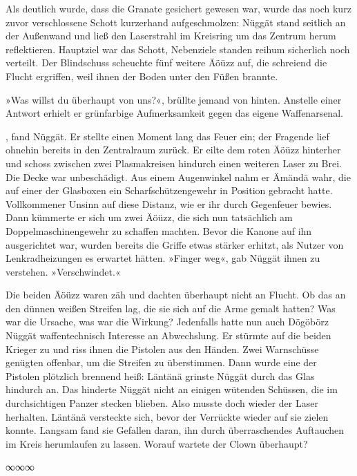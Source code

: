 Als deutlich wurde, dass die Granate gesichert gewesen war, wurde das noch kurz zuvor verschlossene Schott kurzerhand aufgeschmolzen: Nüggät stand seitlich an der Außenwand und ließ den Laserstrahl im Kreisring um das Zentrum herum reflektieren. Hauptziel war das Schott, Nebenziele standen reihum sicherlich noch verteilt. Der Blindschuss scheuchte fünf weitere Äöüzz auf, die schreiend die Flucht ergriffen, weil ihnen der Boden unter den Füßen brannte.

»Was willst du überhaupt von uns?«, brüllte jemand von hinten. Anstelle einer Antwort erhielt er grünfarbige Aufmerksamkeit gegen das eigene Waffenarsenal.

, fand Nüggät. Er stellte einen Moment lang das Feuer ein; der Fragende lief ohnehin bereits in den Zentralraum zurück.  Er eilte dem roten Äöüzz hinterher und schoss zwischen zwei Plasmakreisen hindurch einen weiteren Laser zu Brei. Die Decke war unbeschädigt. Aus einem Augenwinkel nahm er Ämändä wahr, die auf einer der Glasboxen ein Scharfschützengewehr in Position gebracht hatte. Vollkommener Unsinn auf diese Distanz, wie er ihr durch Gegenfeuer bewies. Dann kümmerte er sich um zwei Äöüzz, die sich nun tatsächlich am Doppelmaschinengewehr zu schaffen machten. Bevor die Kanone auf ihn ausgerichtet war, wurden bereits die Griffe etwas stärker erhitzt, als Nutzer von Lenkradheizungen es erwartet hätten. »Finger weg«, gab Nüggät ihnen zu verstehen. »Verschwindet.«

Die beiden Äöüzz waren zäh und dachten überhaupt nicht an Flucht. Ob das an den dünnen weißen Streifen lag, die sie sich auf die Arme gemalt hatten? Was war die Ursache, was war die Wirkung? Jedenfalls hatte nun auch Dögöbörz Nüggät waffentechnisch Interesse an Abwechslung. Er stürmte auf die beiden Krieger zu und riss ihnen die Pistolen aus den Händen. Zwei Warnschüsse genügten offenbar, um die Streifen zu überstimmen. Dann wurde eine der Pistolen plötzlich brennend heiß: Läntänä grinste Nüggät durch das Glas hindurch an. Das hinderte Nüggät nicht an einigen wütenden Schüssen, die im durchsichtigen Panzer stecken blieben. Also musste doch wieder der Laser herhalten. Läntänä versteckte sich, bevor der Verrückte wieder auf sie zielen konnte. Langsam fand sie Gefallen daran, ihn durch überraschendes Auftauchen im Kreis herumlaufen zu lassen. Worauf wartete der Clown überhaupt?

\begin{center}
∞∞∞
\end{center}

